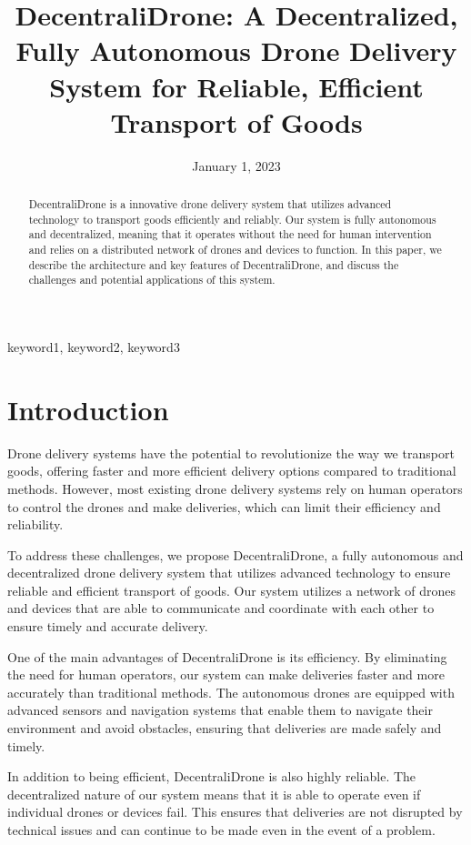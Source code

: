 \documentclass[conference]{IEEEtran}
\title{DecentraliDrone: A Decentralized, Fully Autonomous Drone Delivery System for Reliable, Efficient Transport of Goods}
\author{
\IEEEauthorblockN{Abdul Aziz A.B}
\IEEEauthorblockA{abdulaziz.ahamed2020@vitstudent.ac.in}
\IEEEauthorblockT{VIT University}

\and

\IEEEauthorblockN{Dhairya Gupta}
\IEEEauthorblockA{dhairya.gupta2020@vitstudent.ac.in}
\IEEEauthorblockT{VIT University}

\and

\IEEEauthorblockN{Samik Saraswat}
\IEEEauthorblockA{samik.saraswat2020@vitstudent.ac.in}
\IEEEauthorblockT{VIT University}
}
\date{January 1, 2023}
\begin{document}
\maketitle

\begin{abstract}
DecentraliDrone is a innovative drone delivery system that utilizes advanced technology to transport goods efficiently and reliably. Our system is fully autonomous and decentralized, meaning that it operates without the need for human intervention and relies on a distributed network of drones and devices to function. In this paper, we describe the architecture and key features of DecentraliDrone, and discuss the challenges and potential applications of this system.
\end{abstract}

\begin{IEEEkeywords}
keyword1, keyword2, keyword3
\end{IEEEkeywords}

\section{Introduction}
Drone delivery systems have the potential to revolutionize the way we transport goods, offering faster and more efficient delivery options compared to traditional methods. However, most existing drone delivery systems rely on human operators to control the drones and make deliveries, which can limit their efficiency and reliability.

To address these challenges, we propose DecentraliDrone, a fully autonomous and decentralized drone delivery system that utilizes advanced technology to ensure reliable and efficient transport of goods. Our system utilizes a network of drones and devices that are able to communicate and coordinate with each other to ensure timely and accurate delivery.

One of the main advantages of DecentraliDrone is its efficiency. By eliminating the need for human operators, our system can make deliveries faster and more accurately than traditional methods. The autonomous drones are equipped with advanced sensors and navigation systems that enable them to navigate their environment and avoid obstacles, ensuring that deliveries are made safely and timely.

In addition to being efficient, DecentraliDrone is also highly reliable. The decentralized nature of our system means that it is able to operate even if individual drones or devices fail. This ensures that deliveries are not disrupted by technical issues and can continue to be made even in the event of a problem.
\end{document}
